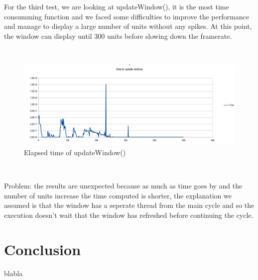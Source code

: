 \documentclass[a4paper,10pt]{book}
\begin{document}
For the third test, we are looking at updateWindow(), it is the most time consumming function and we faced some difficulties to improve the performance and manage to display a large number of units without any spikes. At this point, the window can display until 300 units before slowing down the framerate.

~

\begin{figure}[h]
 \includegraphics[scale=0.5]{updateWindow}
 \caption{Elapsed time of updateWindow()}
\end{figure}

~

Problem: the results are unexpected because as much as time goes by and the number of units increase the time computed is shorter, the explanation we assumed is that the window has a seperate thread from the main cycle and so the execution doesn't wait that the window has refreshed before continuing the cycle.

\section {Conclusion}

blabla
\end{document}
